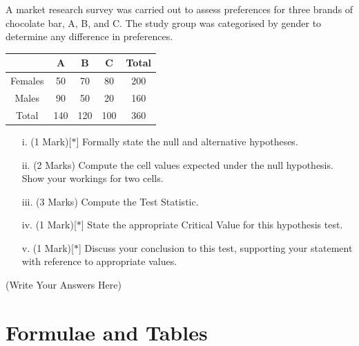 \documentclass[a4paper,12pt]{article}
\begin{document}
A market research survey was carried out to assess preferences for three brands of chocolate bar, A, B, and C. 
The study group was categorised by gender to determine any difference in preferences.


{
	\large
\begin{center}
\begin{tabular}{|c|c|c|c|c|}
\hline
& A & B & C &  Total\\ \hline
Females & 50 & 70 & 80 & 200 \\ \hline
Males   & 90 & 50 & 20 &  160\\ \hline
Total & 140 & 120 & 100 & 360\\ \hline
\end{tabular} 
\end{center}
}
\begin{itemize}
	\item[i.](1 Mark)[$\ast$] Formally state the null and alternative hypotheses.
	\item[ii.] (2 Marks) Compute the cell values expected under the null hypothesis. Show your workings for two cells.
	\item[iii.](3 Marks) Compute the Test Statistic.
	\item[iv.](1 Mark)[$\ast$] State the appropriate Critical Value for this hypothesis test.
	\item[v.](1 Mark)[$\ast$] Discuss your conclusion to this test, supporting your statement with reference to appropriate values.
\end{itemize}
\newpage
(Write Your Answers Here)
%

\newpage


\section*{Formulae and Tables}
\end{document}
